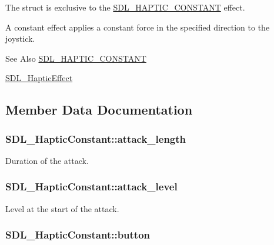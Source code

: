 The struct is exclusive to the \hyperlink{_s_d_l__haptic_8h_a955fb9f680dcf9cc72a3d5263e85b80a}{S\-D\-L\-\_\-\-H\-A\-P\-T\-I\-C\-\_\-\-C\-O\-N\-S\-T\-A\-N\-T} effect.

A constant effect applies a constant force in the specified direction to the joystick.

\begin{DoxySeeAlso}{See Also}
\hyperlink{_s_d_l__haptic_8h_a955fb9f680dcf9cc72a3d5263e85b80a}{S\-D\-L\-\_\-\-H\-A\-P\-T\-I\-C\-\_\-\-C\-O\-N\-S\-T\-A\-N\-T} 

\hyperlink{union_s_d_l___haptic_effect}{S\-D\-L\-\_\-\-Haptic\-Effect} 
\end{DoxySeeAlso}


\subsection{Member Data Documentation}
\hypertarget{struct_s_d_l___haptic_constant_a907bade68ab53fb24e7d2651d19b767f}{
\subsubsection[{attack\-\_\-length}]{ S\-D\-L\-\_\-\-Haptic\-Constant\-::attack\-\_\-length}}\label{struct_s_d_l___haptic_constant_a907bade68ab53fb24e7d2651d19b767f}
Duration of the attack. \hypertarget{struct_s_d_l___haptic_constant_a0928a37f3fab0e5b7daffc7a1d65744c}{
\subsubsection[{attack\-\_\-level}]{ S\-D\-L\-\_\-\-Haptic\-Constant\-::attack\-\_\-level}}\label{struct_s_d_l___haptic_constant_a0928a37f3fab0e5b7daffc7a1d65744c}
Level at the start of the attack. \hypertarget{struct_s_d_l___haptic_constant_aa65321f1b002adaab6e629d5bed556e9}{
\subsubsection[{button}]{ S\-D\-L\-\_\-\-Haptic\-Constant\-::button}}\label{struct_s_d_l___haptic_constant_aa65321f1b002adaab6e629d5bed556e9}
